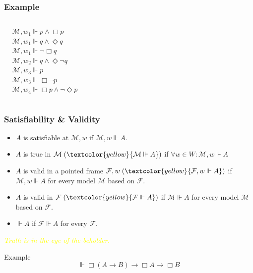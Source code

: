 \documentclass[UTF8,aspectratio=43,11pt,colorlinks,compress,openany]{beamer}%
\begin{document}
\begin{frame}\frametitle{Example}
	\begin{columns}
			\centering{}
			\begin{align*}
			&\mathcal{M},w_1\Vdash p\wedge\Box p\\
			&\mathcal{M},w_1\Vdash q\wedge\Diamond q\\
			&\mathcal{M},w_1\Vdash\neg\Box q\\
			&\mathcal{M},w_2\Vdash q\wedge\Diamond\neg q\\
			&\mathcal{M},w_3\Vdash p\\
			&\mathcal{M},w_3\Vdash\Box\neg p\\
			&\mathcal{M},w_4\Vdash\Box p\wedge\neg\Diamond p
			\end{align*}
	\end{columns}
\end{frame}

\begin{frame}\frametitle{Satisfiability \& Validity}
	\begin{itemize}
		\item $A$ is satisfiable at $\mathcal{M},w$ if $\mathcal{M},w\Vdash A$.
		\item $A$ is true in $\mathcal{M}\;(\textcolor{yellow}{\mathcal{M}\Vdash A})$ if $\forall w\in W: \mathcal{M},w\Vdash A$
		\item $A$ is valid in a pointed frame $\mathcal{F},w\;(\textcolor{yellow}{\mathcal{F},w\Vdash A})$ if $\mathcal{M},w\Vdash A$ for every model $\mathcal{M}$ based on $\mathcal{F}$.
		\item $A$ is valid in $\mathcal{F}\;(\textcolor{yellow}{\mathcal{F}\Vdash A})$ if $\mathcal{M}\Vdash A$ for every model $\mathcal{M}$ based on $\mathcal{F}$.
		\item $\Vdash A$ if $\mathcal{F}\Vdash A$ for every $\mathcal{F}$.
	\end{itemize}
\centering\textcolor{yellow}{\emph{Truth is in the eye of the beholder.}}
\setlength\abovedisplayskip{0pt}
	\begin{block}{Example}
		\[\Vdash\Box(A\to B)\to\Box A\to\Box B\]
	\end{block}
\end{frame}
\end{document}
